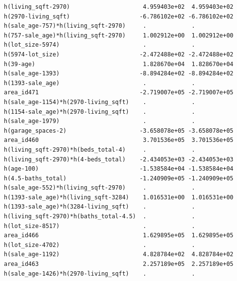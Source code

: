 \documentclass[
]{article}
\begin{document}
\begin{verbatim}
h(living_sqft-2970)                     4.959403e+02  4.959403e+02
h(2970-living_sqft)                    -6.786102e+02 -6.786102e+02
h(sale_age-757)*h(living_sqft-2970)     .             .           
h(757-sale_age)*h(living_sqft-2970)     1.002912e+00  1.002912e+00
h(lot_size-5974)                        .             .           
h(5974-lot_size)                       -2.472488e+02 -2.472488e+02
h(39-age)                               1.828670e+04  1.828670e+04
h(sale_age-1393)                       -8.894284e+02 -8.894284e+02
h(1393-sale_age)                        .             .           
area_id471                             -2.719007e+05 -2.719007e+05
h(sale_age-1154)*h(2970-living_sqft)    .             .           
h(1154-sale_age)*h(2970-living_sqft)    .             .           
h(sale_age-1979)                        .             .           
h(garage_spaces-2)                     -3.658078e+05 -3.658078e+05
area_id460                              3.701536e+05  3.701536e+05
h(living_sqft-2970)*h(beds_total-4)     .             .           
h(living_sqft-2970)*h(4-beds_total)    -2.434053e+03 -2.434053e+03
h(age-100)                             -1.538584e+04 -1.538584e+04
h(4.5-baths_total)                     -1.240909e+05 -1.240909e+05
h(sale_age-552)*h(living_sqft-2970)     .             .           
h(1393-sale_age)*h(living_sqft-3284)    1.016531e+00  1.016531e+00
h(1393-sale_age)*h(3284-living_sqft)    .             .           
h(living_sqft-2970)*h(baths_total-4.5)  .             .           
h(lot_size-8517)                        .             .           
area_id466                              1.629895e+05  1.629895e+05
h(lot_size-4702)                        .             .           
h(sale_age-1192)                        4.828784e+02  4.828784e+02
area_id463                              2.257189e+05  2.257189e+05
h(sale_age-1426)*h(2970-living_sqft)    .             .           
                                                                  

\end{verbatim}
\end{document}
